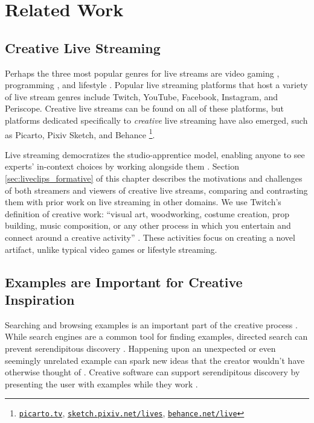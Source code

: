 \section{Related Work}

\subsection{Creative Live Streaming}
Perhaps the three most popular genres for live streams are video gaming \cite{Pellicone2017, Lessel2017, Sjoblom2017, Hamilton2014}, programming \cite{Faas2018, Haaranen2017}, and lifestyle \cite{Lu2018a, Tang2016}. Popular live streaming platforms that host a variety of live stream genres include Twitch, YouTube, Facebook, Instagram, and Periscope. Creative live streams can be found on all of these platforms, but platforms dedicated specifically to \textit{creative} live streaming have also emerged, such as Picarto, Pixiv Sketch, and Behance \footnote{\href{www.picarto.tv}{\nolinkurl{picarto.tv}}, \href{https://sketch.pixiv.net/lives}{\nolinkurl{sketch.pixiv.net/lives}}, \href{https://behance.net/live}{\nolinkurl{behance.net/live}}}.

Live streaming democratizes the studio-apprentice model, enabling anyone to see experts' in-context choices by working alongside them \cite{Schon1985}. Section \ref{sec:liveclips_formative} of this chapter describes the motivations and challenges of both streamers and viewers of creative live streams, comparing and contrasting them with prior work on live streaming in other domains. We use Twitch's definition of creative work: ``visual art, woodworking, costume creation, prop building, music composition, or any other process in which you entertain and connect around a creative activity'' \cite{Moorier2015}. These activities focus on creating a novel artifact, unlike typical video games or lifestyle streaming.

\subsection{Examples are Important for Creative Inspiration}
Searching and browsing examples is an important part of the creative process \cite{Shneiderman2002, Shneiderman2007, Greene2002, Herring2009, Muller-Wienbergen2011, Bawden1986}. 
While search engines are a common tool for finding examples, directed search can prevent serendipitous discovery \cite{Benjamin2014}. Happening upon an unexpected or even seemingly unrelated example can spark new ideas that the creator wouldn't have otherwise thought of \cite{Erdelez1999, Benjamin2014}.
Creative software can support serendipitous discovery by presenting the user with examples while they work \cite{Bawden1986, Kulkarni2014, Herring2009}.

